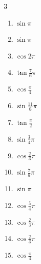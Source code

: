 \begin{multicols}{3}
\begin{enumerate}
  \item $\displaystyle \sin{\pi}$
        \phantom{$\displaystyle =0$}

  \item $\displaystyle \sin{\pi}$
        \phantom{$\displaystyle =0$}

  \item $\displaystyle \cos{2\pi}$
        \phantom{$\displaystyle =1$}

  \item $\displaystyle \tan{\frac{7}{6}\pi}$

  \item $\displaystyle \cos{\frac{\pi}{4}}$

  \item $\displaystyle \sin{\frac{11}{6}\pi}$

  \item $\displaystyle \tan{\frac{\pi}{2}}$
        \phantom{$\displaystyle \quad なし$}

  \item $\displaystyle \sin{\frac{3}{4}\pi}$

  \item $\displaystyle \cos{\frac{2}{3}\pi}$

  \item $\displaystyle \sin{\frac{7}{6}\pi}$

  \item $\displaystyle \sin{\pi}$
        \phantom{$\displaystyle =0$}

  \item $\displaystyle \cos{\frac{5}{4}\pi}$

\columnbreak %

  \item $\displaystyle \cos{\frac{2}{3}\pi}$

  \item $\displaystyle \cos{\frac{2}{3}\pi}$

  \item $\displaystyle \cos{\frac{\pi}{4}}$


\end{enumerate}
\end{multicols}
